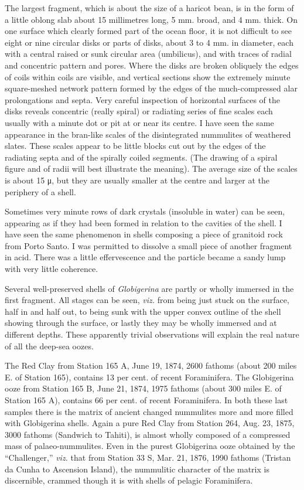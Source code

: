 \documentclass[a4paper, 12pt, oneside]{article}
\begin{document}
The largest fragment, which is about the size of a haricot bean, is in the form of a little oblong slab about 15 millimetres long, 5 mm. broad, and 4 mm. thick. On one surface which clearly formed part of the ocean floor, it is not difficult to see eight or nine circular disks or parts of disks, about 3 to 4 mm. in diameter, each with a central raised or sunk circular area (umbilicus), and with traces of radial and concentric pattern and pores. Where the disks are broken obliquely the edges of coils within coils are visible, and vertical sections show the extremely minute square-meshed network pattern formed by the edges of the much-compressed alar prolongations and septa. Very careful inspection of horizontal surfaces of the disks reveals concentric (really spiral) or radiating series of fine scales each usually with a minute dot or pit at or near its centre. I have seen the same appearance in the bran-like scales of the disintegrated nummulites of weathered slates. These scales appear to be little blocks cut out by the edges of the radiating septa and of the spirally coiled segments. (The drawing of a spiral figure and of radii will best illustrate the meaning). The average size of the scales is about 15 μ, but they are usually smaller at the centre and larger at the periphery of a shell.

Sometimes very minute rows of dark crystals (insoluble in water) can be seen, appearing as if they had been formed in relation to the cavities of the shell. I have seen the same phenomenon in shells composing a piece of granitoid rock from Porto Santo. I was permitted to dissolve a small piece of another fragment in acid. There was a little effervescence and the particle became a sandy lump with very little coherence.

Several well-preserved shells of \emph{Globigerina} are partly or wholly immersed in the first fragment. All stages can be seen, \emph{viz.} from being just stuck on the surface, half in and half out, to being sunk with the upper convex outline of the shell showing through the surface, or lastly they may be wholly immersed and at different depths. These apparently trivial observations will explain the real nature of all the deep-sea oozes.

The Red Clay from Station 165 A, June 19, 1874, 2600 fathoms (about 200 miles E. of Station 165), contains 13 per cent. of recent Foraminifera. The Globigerina ooze from Station 165 B, June 21, 1874, 1975 fathoms (about 300 miles E. of Station 165 A), contains 66 per cent. of recent Foraminifera. In both these last samples there is the matrix of ancient changed nummulites more and more filled with Globigerina shells. Again a pure Red Clay from Station 264, Aug. 23, 1875, 3000 fathoms (Sandwich to Tahiti), is almost wholly composed of a compressed mass of palaeo-nummulites. Even in the purest Globigerina ooze obtained by the ``Challenger,'' \emph{viz.} that from Station 33 S, Mar. 21, 1876, 1990 fathoms (Tristan da Cunha to Ascension Island), the nummulitic character of the matrix is discernible, crammed though it is with shells of pelagic Foraminifera.
\end{document}
